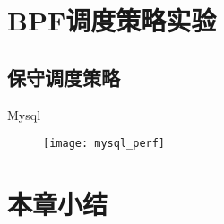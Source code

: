 \section{BPF调度策略实验}

\subsection{保守调度策略}

Mysql

\begin{figure}[!htbp]
    \centering
    \texttt{[image: mysql\_perf]}
    \label{fig:mysql_perf}
\end{figure}



\section{本章小结}